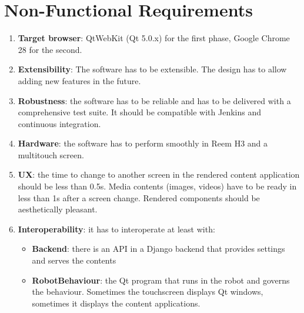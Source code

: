 \section{Non-Functional Requirements}
\begin{enumerate}
    \item \textbf{Target browser}: QtWebKit (Qt 5.0.x) for the first phase, Google Chrome 28 for the second.
    \item \textbf{Extensibility}: The software has to be extensible. The design has to allow adding new features in the future.
    \item \textbf{Robustness}: the software has to be reliable and has to be delivered with a comprehensive test suite. It should be compatible with Jenkins and continuous integration.
    \item \textbf{Hardware}: the software has to perform smoothly in Reem H3 and a multitouch screen.
    \item \textbf{\ac{UX}}: the time to change to another screen in the rendered content application should be less than 0.5s. Media contents (images, videos) have to be ready in less than 1s after a screen change. Rendered components should be aesthetically pleasant.
    \item \textbf{Interoperability}: it has to interoperate at least with:
    \begin{itemize}
        \item \textbf{Backend}: there is an \ac{API} in a Django backend that provides settings and serves the contents
        \item \textbf{RobotBehaviour}: the Qt program that runs in the robot and governs the behaviour. Sometimes the touchscreen displays Qt windows, sometimes it displays the content applications. 
    \end{itemize}
\end{enumerate}